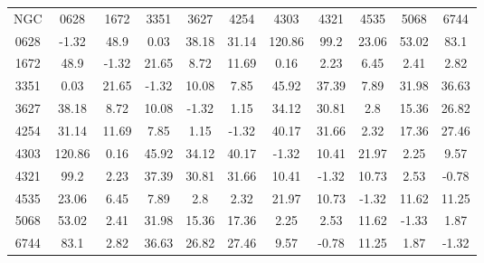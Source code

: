 \begin{table}
\begin{tabular}{ccccccccccc}
NGC & 0628 & 1672 & 3351 & 3627 & 4254 & 4303 & 4321 & 4535 & 5068 & 6744 \\
0628 & -1.32 & 48.9 & 0.03 & 38.18 & 31.14 & 120.86 & 99.2 & 23.06 & 53.02 & 83.1 \\
1672 & 48.9 & -1.32 & 21.65 & 8.72 & 11.69 & 0.16 & 2.23 & 6.45 & 2.41 & 2.82 \\
3351 & 0.03 & 21.65 & -1.32 & 10.08 & 7.85 & 45.92 & 37.39 & 7.89 & 31.98 & 36.63 \\
3627 & 38.18 & 8.72 & 10.08 & -1.32 & 1.15 & 34.12 & 30.81 & 2.8 & 15.36 & 26.82 \\
4254 & 31.14 & 11.69 & 7.85 & 1.15 & -1.32 & 40.17 & 31.66 & 2.32 & 17.36 & 27.46 \\
4303 & 120.86 & 0.16 & 45.92 & 34.12 & 40.17 & -1.32 & 10.41 & 21.97 & 2.25 & 9.57 \\
4321 & 99.2 & 2.23 & 37.39 & 30.81 & 31.66 & 10.41 & -1.32 & 10.73 & 2.53 & -0.78 \\
4535 & 23.06 & 6.45 & 7.89 & 2.8 & 2.32 & 21.97 & 10.73 & -1.32 & 11.62 & 11.25 \\
5068 & 53.02 & 2.41 & 31.98 & 15.36 & 17.36 & 2.25 & 2.53 & 11.62 & -1.33 & 1.87 \\
6744 & 83.1 & 2.82 & 36.63 & 26.82 & 27.46 & 9.57 & -0.78 & 11.25 & 1.87 & -1.32 \\
\end{tabular}
\end{table}
